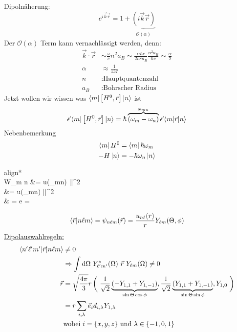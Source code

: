 	Dipolnäherung: 
		\begin{equation*}
			e^{i \vec{k} \vec{r}} = 1 + 
			\underbrace{(i \vec{k} \vec{r})}_{\substack{\mathcal{O}(\alpha)}}
		\end{equation*}
	Der $\mathcal{O}(\alpha)$ Term kann vernachlässigt werden, denn:
		\begin{align*}
			\vec{k} \cdot \vec{r} 
			&\sim \frac{\omega}{c} n^2 a_B
			\sim \frac{\alpha \hbar c}{2 n^2 a_B} \frac{n^2 a_B}{\hbar c}
			\sim \frac{\alpha}{2} \\
			\alpha &\approx \frac{1}{137} \\
			n &: \text{Hauptquantenzahl} \\	
			a_B &: \text{Bohrscher Radius}		
		\end{align*}
	Jetzt wollen wir wissen was $\braket{m | \left[H^0 , \vec{r}\right] | n}$ ist
		\begin{align*}
			\vec{\epsilon} \braket{m | \left[H^0 , \vec{r}\right] | n} 
			= \hbar \overbrace{(\omega_m - \omega_n)}^{\mathclap{\omega_{mn}}} \vec{\epsilon} \braket{m | \vec{r} | n}
		\end{align*}
	Nebenbemerkung 
		\begin{align*}
			\bra{m} H^0 &= \bra{m} \hbar \omega_m \\
			-H \ket{n} &= -\hbar \omega_n \ket{n}
		\end{align*}
		\begin{empheq}[box=\boxed]{align*}
			 \\
					W_{m \rightarrow n} &=  u(\omega_{mn}) 
					\left|\right|^2\\
					&=  u(\omega_{mn}) 
					\left|\right|^2\\
					&  = e  =  \cdot {}
		\end{empheq}
		\begin{equation*}
			\braket{\vec{r} | n \ell m} = \psi_{n \ell m} (\vec{r}) 
			= \frac{u_{n \ell}(r)}{r} Y_{\ell m} (\Theta, \phi)
		\end{equation*}
	\underline{Dipolauswahlregeln:}
		\begin{align*}
			\braket{n' \ell' m' | \vec{r} | n \ell m} &\neq 0 \\
			&\Rightarrow \int \diff \Omega~Y^*_{\ell' m'}(\Omega)~\vec{r}~Y_{\ell m} (\Omega) \neq 0 \\
			\vec{r} &= \sqrt{\frac{4 \pi}{3}} r 
			\left( \vphantom{-\frac{1}{\sqrt{2}}} \right. 
				\frac{1}{\sqrt{2}} 
				\underbrace{(-Y_{1,1} + Y_{1,-1})}_{\mathclap{\sin \Theta \cos \phi}},
				\frac{1}{\sqrt{2}} \underbrace{(Y_{1,1} + Y_{1,-1})}_{\mathclap{\sin \Theta \sin \phi}},
				Y_{1,0}
			\left. \vphantom{-\frac{1}{\sqrt{2}}} \right) \\
			&= r \sum_{i,\lambda} \vec{e}_i d_{i,\lambda} Y_{1,\lambda} \\
			&\text{wobei~} i = \{x,y,z\} \text{~und~} \lambda \in \{-1,0,1\} 
		\end{align*}
